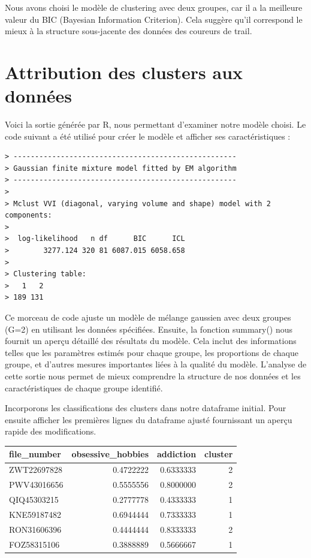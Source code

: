 \documentclass[
]{article}
\begin{document}
Nous avons choisi le modèle de clustering avec deux groupes, car il a la
meilleure valeur du BIC (Bayesian Information Criterion). Cela suggère
qu'il correspond le mieux à la structure sous-jacente des données des
coureurs de trail.

\newpage

\hypertarget{attribution-des-clusters-aux-donnuxe9es}{%
\section{Attribution des clusters aux
données}\label{attribution-des-clusters-aux-donnuxe9es}}

Voici la sortie générée par R, nous permettant d'examiner notre modèle
choisi. Le code suivant a été utilisé pour créer le modèle et afficher
ses caractéristiques :

\begin{verbatim}
> ---------------------------------------------------- 
> Gaussian finite mixture model fitted by EM algorithm 
> ---------------------------------------------------- 
> 
> Mclust VVI (diagonal, varying volume and shape) model with 2 components: 
> 
>  log-likelihood   n df      BIC      ICL
>        3277.124 320 81 6087.015 6058.658
> 
> Clustering table:
>   1   2 
> 189 131
\end{verbatim}

Ce morceau de code ajuste un modèle de mélange gaussien avec deux
groupes (G=2) en utilisant les données spécifiées. Ensuite, la fonction
summary() nous fournit un aperçu détaillé des résultats du modèle. Cela
inclut des informations telles que les paramètres estimés pour chaque
groupe, les proportions de chaque groupe, et d'autres mesures
importantes liées à la qualité du modèle. L'analyse de cette sortie nous
permet de mieux comprendre la structure de nos données et les
caractéristiques de chaque groupe identifié.

Incorporons les classifications des clusters dans notre dataframe
initial. Pour ensuite afficher les premières lignes du dataframe ajusté
fournissant un aperçu rapide des modifications.

\begin{longtable}{lrrr}
\toprule
file\_number & obsessive\_hobbies & addiction & cluster \\ 
\midrule\addlinespace[2.5pt]
ZWT22697828 & 0.4722222 & 0.6333333 & 2 \\ 
PWV43016656 & 0.5555556 & 0.8000000 & 2 \\ 
QIQ45303215 & 0.2777778 & 0.4333333 & 1 \\ 
KNE59187482 & 0.6944444 & 0.7333333 & 1 \\ 
RON31606396 & 0.4444444 & 0.8333333 & 2 \\ 
FOZ58315106 & 0.3888889 & 0.5666667 & 1 \\ 
\bottomrule
\end{longtable}
\end{document}
